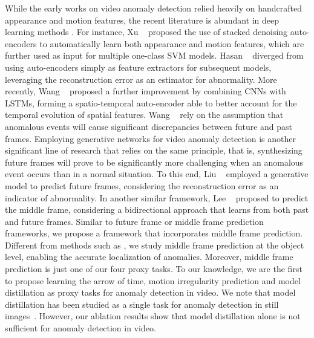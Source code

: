\documentclass[final]{cvpr}
\begin{document}
While the early works \cite{Adam-PAMI-2008,Antic-ICCV-2011,Cong-2013,Li-PAMI-2014,Lu-ICCV-2013,Mahadevan-CVPR-2010,Mehran-CVPR-2009,Saligrama-CVPR-2012,Wu-CVPR-2010} on video anomaly detection relied heavily on handcrafted appearance and motion features, the recent literature is abundant in deep learning methods \cite{Doshi-CVPRW-2020a,Doshi-CVPRW-2020b,Hasan-CVPR-2016,Hinami-ICCV-2017,Ionescu-CVPR-2019,Liu-CVPR-2018,Luo-ICCV-2017,Ramachandra-WACV-2020b,Ravanbakhsh-WACV-2018,Ravanbakhsh-ICIP-2017,Sabokrou-IP-2017,Smeureanu-ICIAP-2017,Wang-ICIP-2018,Xu-BMVC-2015,Xu-CVIU-2017}. For instance, Xu \etal~\cite{Xu-BMVC-2015} proposed the use of stacked denoising auto-encoders to automatically learn both appearance and motion features, which are further used as input for multiple one-class SVM models.
Hasan \etal~\cite{Hasan-CVPR-2016} diverged from using auto-encoders simply as feature extractors for subsequent models, leveraging the reconstruction error as an estimator for abnormality. More recently, Wang \etal~\cite{Wang-ICIP-2018} proposed a further improvement by combining CNNs with LSTMs, forming a spatio-temporal auto-encoder able to better account for the temporal evolution of spatial features. Wang \etal~\cite{Wang-ICIP-2018} rely on the assumption that anomalous events will cause significant discrepancies between future and past frames. 
Employing generative networks for video anomaly detection \cite{Dong-Access-2020,Park-CVPR-2020,Ravanbakhsh-ICIP-2017} is another significant line of research that relies on the same principle, that is, synthesizing future frames will prove to be significantly more challenging when an anomalous event occurs than in a normal situation. To this end, Liu \etal~\cite{Liu-CVPR-2018} employed a generative model to predict future frames, considering the reconstruction error as an indicator of abnormality. In another similar framework, Lee \etal~\cite{Lee-TIP-2019} proposed to predict the middle frame, considering a bidirectional approach that learns from both past and future frames. Similar to future frame \cite{Dong-Access-2020,Liu-CVPR-2018} or middle frame \cite{Lee-TIP-2019} prediction frameworks, we propose a framework that incorporates middle frame prediction. Different from methods such as \cite{Dong-Access-2020,Lee-TIP-2019,Liu-CVPR-2018,Wang-ICIP-2018}, we study middle frame prediction at the object level, enabling the accurate localization of anomalies. Moreover, middle frame prediction is just one of our four proxy tasks. To our knowledge, we are the first to propose learning the arrow of time, motion irregularity prediction and model distillation as proxy tasks for anomaly detection in video. We note that model distillation has been studied as a single task for anomaly detection in still images~\cite{Bergmann-CVPR-2020}. However, our ablation results show that model distillation alone is not sufficient for anomaly detection in video.
\end{document}
